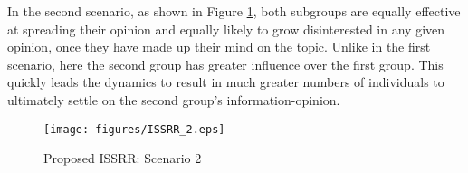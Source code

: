 In the second scenario, as shown in Figure \ref{fig:ISSRR_2}, both subgroups are equally effective at spreading their opinion and equally likely to grow disinterested in any given opinion, once they have made up their mind on the topic. Unlike in the first scenario, here the second group has greater influence over the first group. This quickly leads the dynamics to result in much greater numbers of individuals to ultimately settle on the second group's information-opinion.

\begin{figure}[!htbp] \centering
  \texttt{[image: figures/ISSRR\_2.eps]}
  \caption{Proposed ISSRR: Scenario 2}
  \label{fig:ISSRR_2}
\end{figure}